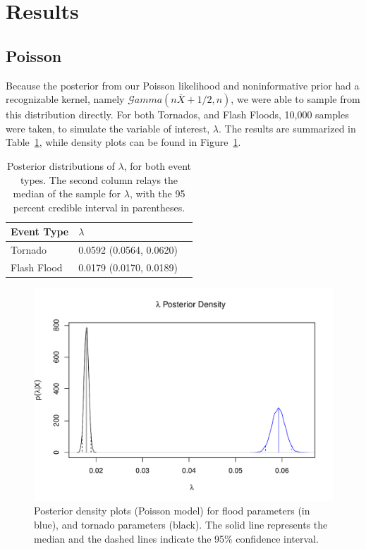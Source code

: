 \documentclass{article}\usepackage[]{graphicx}\usepackage[]{color}
\begin{document}
\section{Results}
\label{s:results}
\subsection{Poisson}
\label{ss:rPoisson}

Because the posterior from our Poisson likelihood and noninformative prior had a recognizable kernel, namely $\mathcal{G}amma(n\bar{X}+1/2,n)$, we were able to sample from this distribution directly. For both Tornados, and Flash Floods, 10,000 samples were taken, to simulate the variable of interest, $\lambda$. The results are summarized in Table~\ref{t:rPOIS}, while density plots can be found in Figure~\ref{f:poisdensity}.

\begin{table}
    \centering
    \caption{Posterior distributions of $\lambda$, for both event types. The second column relays the median of the sample for $\lambda$, with the 95 percent credible interval in parentheses.}
    \label{t:rPOIS}
    \begin{tabular}{| l | l | l |}
    \hline
    Event Type & $\lambda$  \\ \hline
    Tornado & 0.0592 (0.0564, 0.0620) \\ \hline
    Flash Flood & 0.0179 (0.0170, 0.0189) \\ \hline
    \end{tabular}
\end{table}

\begin{figure}[p]
\centering
\includegraphics[width=.65\textwidth]{figure/POIS_Density.pdf}
\caption{Posterior density plots (Poisson model) for flood parameters (in blue), and tornado parameters (black). The solid line represents the median and the dashed lines indicate the 95\% confidence interval.}
\label{f:poisdensity}
\end{figure}
\end{document}
